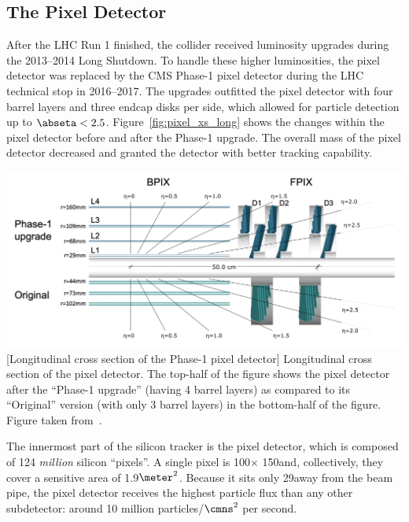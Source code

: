 \subsection{The Pixel Detector}
\label{sec:pixel}
After the LHC Run 1 finished, the collider received luminosity upgrades during the 2013--2014 Long Shutdown.
To handle these higher luminosities, the pixel detector was replaced by the CMS Phase-1 pixel detector during the LHC technical stop in 2016--2017.
The upgrades outfitted the pixel detector with four barrel layers and three endcap disks per side, which allowed for particle detection up to $\abseta < 2.5$.
Figure~\ref{fig:pixel_xs_long} shows the changes within the pixel detector before and after the Phase-1 upgrade.
The overall mass of the pixel detector decreased and granted the detector with better tracking capability.
\begin{multiFigure}
    \centering
    \includegraphics[width=\textwidth]{figures/cms/tracker/pixel_barrel_upgrade.png}
        [Longitudinal cross section of the Phase-1 pixel detector]
        {Longitudinal cross section of the pixel detector.
        The top-half of the figure shows the pixel detector after the ``Phase-1 upgrade'' (\eg having 4 barrel layers) as compared to its ``Original'' version (with only 3 barrel layers) in the bottom-half of the figure.
        Figure taken from~\cite{pixel_phase1}.}
    \label{fig:pixel_xs_long}
\end{multiFigure}

The innermost part of the silicon tracker is the pixel detector, which is composed of 124 \emph{million} silicon ``pixels''.
A single pixel is 100\mum $\times$ 150\mum and, collectively, they cover a sensitive area of 1.9$\meter^2$.
Because it sits only 29\mm away from the beam pipe, the pixel detector receives the highest particle flux than any other subdetector:
around 10 million particles/$\cmns^2$ per second.


